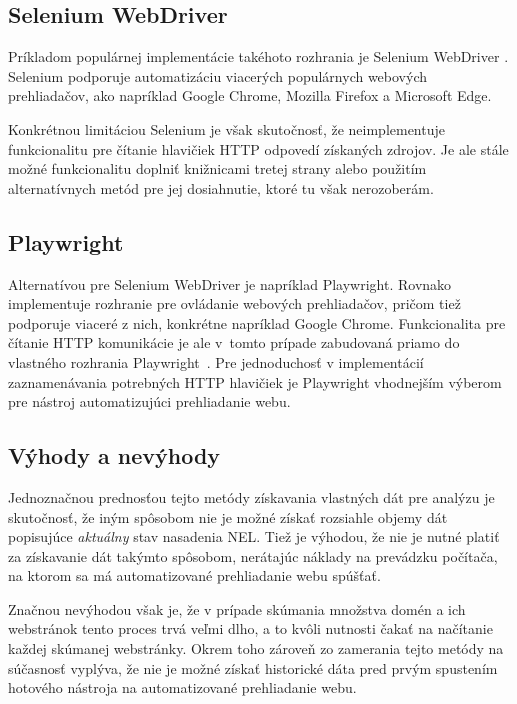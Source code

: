 \subsection{Selenium WebDriver}

Príkladom populárnej implementácie takéhoto rozhrania je Selenium WebDriver \cite{crawling-selenium}.
Selenium podporuje automatizáciu viacerých populárnych webových prehliadačov, ako napríklad Google Chrome, Mozilla Firefox a Microsoft Edge.

Konkrétnou limitáciou Selenium je však skutočnosť, že neimplementuje funkcionalitu pre čítanie hlavičiek HTTP odpovedí získaných zdrojov.
Je ale stále možné funkcionalitu doplniť knižnicami tretej strany alebo použitím alternatívnych metód pre jej dosiahnutie, ktoré tu však nerozoberám.

\subsection{Playwright}

Alternatívou pre Selenium WebDriver je napríklad Playwright.
Rovnako implementuje rozhranie pre ovládanie webových prehliadačov,
pričom tiež podporuje viaceré z nich, konkrétne napríklad Google Chrome.
Funkcionalita pre čítanie HTTP komunikácie je ale \mbox{v tomto} prípade zabudovaná priamo do vlastného rozhrania \mbox{Playwright \cite{crawling-playwright}}.
Pre jednoduchosť v implementácií zaznamenávania potrebných HTTP hlavičiek je Playwright vhodnejším výberom pre nástroj automatizujúci prehliadanie webu.

\subsection{Výhody a nevýhody}

Jednoznačnou prednosťou tejto metódy získavania vlastných dát pre analýzu je skutočnosť, že iným spôsobom nie je možné získať rozsiahle objemy dát popisujúce \textit{aktuálny} stav nasadenia NEL.
Tiež je výhodou, že nie je nutné platiť za získavanie dát takýmto spôsobom, nerátajúc náklady na prevádzku počítača, na ktorom sa má automatizované prehliadanie webu spúšťať.

Značnou nevýhodou však je, že v prípade skúmania množstva domén a ich webstránok tento proces trvá veľmi dlho, a to kvôli nutnosti čakať na načítanie každej skúmanej webstránky. 
Okrem toho zároveň zo zamerania tejto metódy na súčasnosť vyplýva, že nie je možné získať historické dáta pred prvým spustením hotového nástroja na automatizované prehliadanie webu.  

